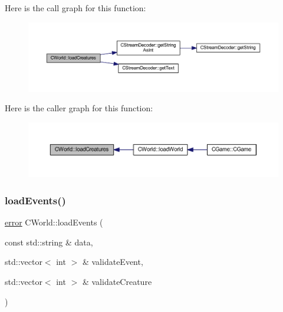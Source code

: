 Here is the call graph for this function\+:\nopagebreak
\begin{figure}[H]
\begin{center}
\leavevmode
\includegraphics[width=350pt]{class_c_world_a313cf7258bfab897ada813aa0f8837ac_cgraph}
\end{center}
\end{figure}
Here is the caller graph for this function\+:\nopagebreak
\begin{figure}[H]
\begin{center}
\leavevmode
\includegraphics[width=350pt]{class_c_world_a313cf7258bfab897ada813aa0f8837ac_icgraph}
\end{center}
\end{figure}
\mbox{\label{class_c_world_afa6876cb4b0d0aa9aec88fec6c596634}} 
\subsubsection{\texorpdfstring{load\+Events()}{loadEvents()}}
{\footnotesize\ttfamily \mbox{\hyperlink{_errors_list_8h_af10dacfa214e2575bb2e0ee407c242e0}{error}} C\+World\+::load\+Events (\begin{DoxyParamCaption}\item[{const std\+::string \&}]{data,  }\item[{std\+::vector$<$ int $>$ \&}]{validate\+Event,  }\item[{std\+::vector$<$ int $>$ \&}]{validate\+Creature }\end{DoxyParamCaption})\hspace{0.3cm}{\ttfamily [protected]}}

